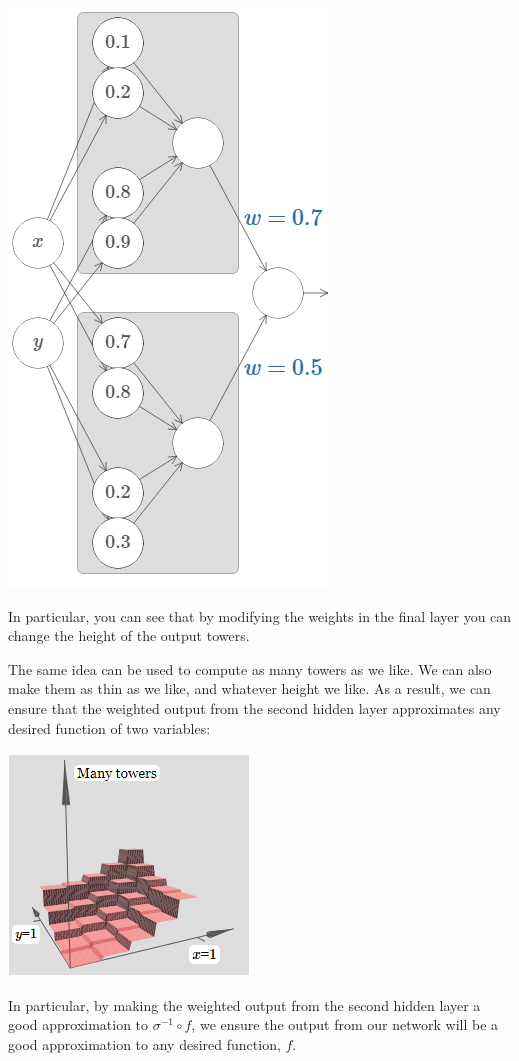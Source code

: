 {\centering \includegraphics[width=.6\textwidth,]{pic/wigglyfn36} \par}


In particular, you can see that by modifying the weights in the final layer you can change the height of the output towers.

The same idea can be used to compute as many towers as we like. We can also make them as thin as we like, and whatever height we like. As a result, we can ensure that the weighted output from the second hidden layer approximates any desired function of two variables:

{\centering \includegraphics[width=.4\textwidth,]{pic/wigglyfn33} \par}

In particular, by making the weighted output from the second hidden layer a good approximation to $\sigma^{-1}\circ f$, we ensure the output from our network will be a good approximation to any desired function, $f$.


